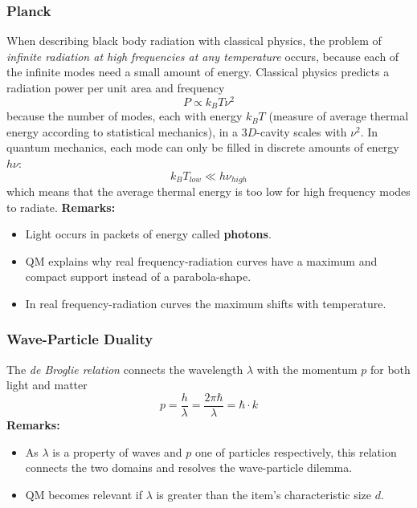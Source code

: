 \subsubsection{Planck}
When describing black body radiation with classical physics, the problem of \textit{infinite radiation at
    high frequencies at any temperature} occurs, because each of the infinite modes need a small amount of energy.
Classical physics predicts a radiation power per unit area and frequency 
\begin{equation*}
    P \propto k_B T \nu^2
\end{equation*}
because the number of modes, each with energy $k_B T$ (measure of average thermal energy according to statistical mechanics), in a $3D$-cavity scales with $\nu^2$.
In quantum mechanics, each mode can only be filled in discrete amounts of energy $h \nu$:
\begin{equation*}
    k_B T_{low} \ll h\nu_{high}
\end{equation*}
which means that the average thermal energy is too low for high frequency modes to radiate.
\newpar{}
\textbf{Remarks:}
\begin{itemize}
    \item Light occurs in packets of energy called \textbf{photons}.
    \item QM explains why real frequency-radiation curves have a maximum and compact support instead of a parabola-shape.
    \item In real frequency-radiation curves the maximum shifts with temperature.
\end{itemize}

\subsubsection{Wave-Particle Duality}
The \textit{de Broglie relation} connects the wavelength $\lambda$ with the momentum $p$ for both light and matter
\begin{equation*}
    p=\frac{h}{\lambda}=\frac{2\pi\hbar}{\lambda}=\hbar\cdot k
\end{equation*}
\textbf{Remarks:}
\begin{itemize}
    \item As $\lambda$ is a property of waves and $p$ one of particles respectively, this relation connects the two domains and resolves the wave-particle dilemma.
    \item QM becomes relevant if $\lambda$ is greater than the item's characteristic size $d$.
\end{itemize}

